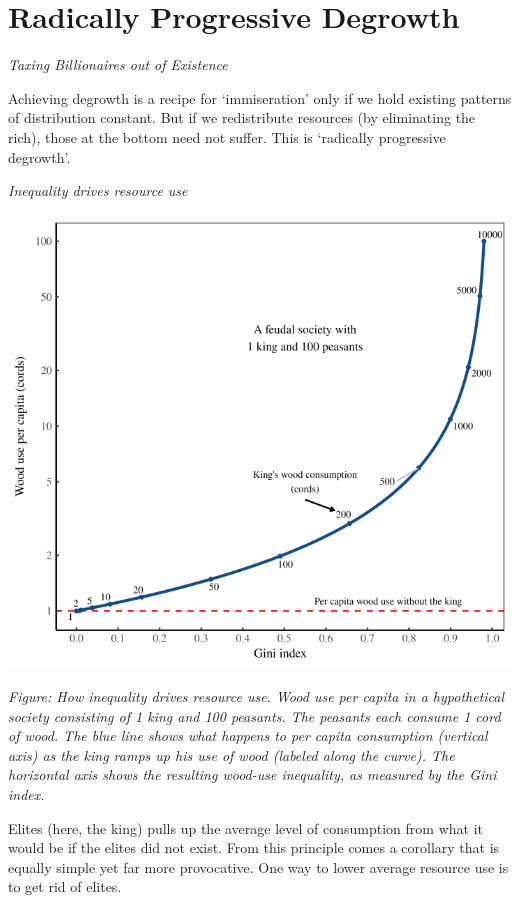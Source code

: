 \documentclass[
]{book}
\begin{document}
\hypertarget{radically-progressive-degrowth}{%
\section{Radically Progressive Degrowth}\label{radically-progressive-degrowth}}

\emph{Taxing Billionaires out of Existence}

Achieving degrowth is a recipe for `immiseration' only if we hold
existing patterns of distribution constant.
But if we redistribute resources (by eliminating the rich),
those at the bottom need not suffer.
This is `radically progressive degrowth'.

\emph{Inequality drives resource use}

\includegraphics{fig/fix_kingdom.png}

\emph{Figure: How inequality drives resource use.
Wood use per capita in a hypothetical society consisting of 1 king and 100 peasants.
The peasants each consume 1 cord of wood.
The blue line shows what happens to per capita consumption (vertical axis)
as the king ramps up his use of wood (labeled along the curve).
The horizontal axis shows the resulting wood-use inequality, as measured by the Gini index.}

Elites (here, the king) pulls up the average level of consumption from
what it would be if the elites did not exist.
From this principle comes a corollary that is equally simple yet far more provocative.
One way to lower average resource use is to get rid of elites.
\end{document}
